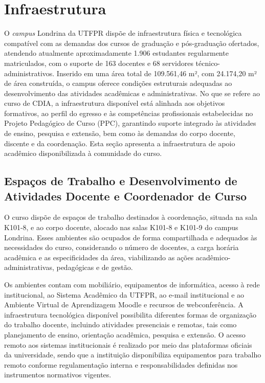 \chapter{Infraestrutura}

O \textit{campus} Londrina da UTFPR dispõe de infraestrutura física e tecnológica compatível com as demandas dos cursos de graduação e pós-graduação ofertados, atendendo atualmente aproximadamente 1.906 estudantes regularmente matriculados, com o suporte de 163 docentes e 68 servidores técnico-administrativos. Inserido em uma área total de 109.561,46 m², com 24.174,20 m² de área construída, o campus oferece condições estruturais adequadas ao desenvolvimento das atividades acadêmicas e administrativas. No que se refere ao curso de CDIA, a infraestrutura disponível está alinhada aos objetivos formativos, ao perfil do egresso e às competências profissionais estabelecidas no Projeto Pedagógico de Curso (PPC), garantindo suporte integrado às atividades de ensino, pesquisa e extensão, bem como às demandas do corpo docente, discente e da coordenação. Esta seção apresenta a infraestrutura de apoio acadêmico disponibilizada à comunidade do curso.

\section{Espaços de Trabalho e Desenvolvimento de Atividades Docente e Coordenador de Curso}

O curso dispõe de espaços de trabalho destinados à coordenação, situada na sala K101-8, e ao corpo docente, alocado nas salas K101-8 e K101-9 do campus Londrina. Esses ambientes são ocupados de forma compartilhada e adequados às necessidades do curso, considerando o número de docentes, a carga horária acadêmica e as especificidades da área, viabilizando as ações acadêmico-administrativas, pedagógicas e de gestão.

Os ambientes contam com mobiliário, equipamentos de informática, acesso à rede institucional, ao Sistema Acadêmico da UTFPR, ao e-mail institucional e ao Ambiente Virtual de Aprendizagem Moodle e recursos de webconferência. A infraestrutura tecnológica disponível possibilita diferentes formas de organização do trabalho docente, incluindo atividades presenciais e remotas, tais como planejamento de ensino, orientação acadêmica, pesquisa e extensão. O acesso remoto aos sistemas institucionais é realizado por meio das plataformas oficiais da universidade, sendo que a instituição disponibiliza equipamentos para trabalho remoto conforme regulamentação interna e responsabilidades definidas nos instrumentos normativos vigentes.

